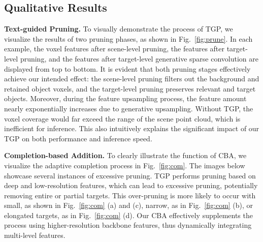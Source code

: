 

\subsection{Qualitative Results}
\textbf{Text-guided Pruning.}
To visually demonstrate the process of TGP, we visualize the results of two pruning phases, as shown in Fig.~\ref{fig:prune}. In each example, the voxel features after scene-level pruning, the features after target-level pruning, and the features after target-level generative sparse convolution are displayed from top to bottom. It is evident that both pruning stages effectively achieve our intended effect: the scene-level pruning filters out the background and retained object voxels, and the target-level pruning preserves relevant and target objects. Moreover, during the feature upsampling process, the feature amount nearly exponentially increases due to generative upsampling. Without TGP, the voxel coverage would far exceed the range of the scene point cloud, which is inefficient for inference. This also intuitively explains the significant impact of our TGP on both performance and inference speed.



\textbf{Completion-based Addition.}
To clearly illustrate the function of CBA, we visualize the adaptive completion process in Fig.~\ref{fig:com}. The images below showcase several instances of excessive pruning. TGP performs pruning based on deep and low-resolution features, which can lead to excessive pruning, potentially removing entire or partial targets. This over-pruning is more likely to occur with small, as shown in Fig.~\ref{fig:com} (a) and (c), narrow, as in Fig.~\ref{fig:com} (b), or elongated targets, as in Fig.~\ref{fig:com} (d). Our CBA effectively supplements the process using higher-resolution backbone features, thus dynamically integrating multi-level features.